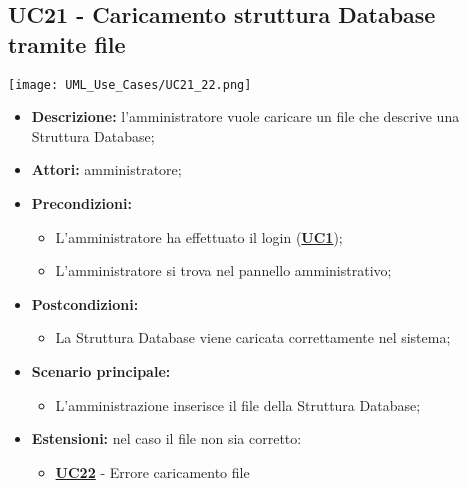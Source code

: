 \subsection{UC21 - Caricamento struttura Database tramite file}
\label{sec:UC21}
\texttt{[image: UML\_Use\_Cases/UC21\_22.png]}
\begin{itemize}
	\item \textbf{Descrizione:} l’amministratore vuole caricare un file che descrive una Struttura Database;
	\item \textbf{Attori:} amministratore;
	\item \textbf{Precondizioni:} 
	\begin{itemize}
		\item L’amministratore ha effettuato il login (\hyperref[sec:UC1]{\textbf{UC1}});
		\item L’amministratore si trova nel pannello amministrativo;
	\end{itemize}
	\item \textbf{Postcondizioni:} 
	\begin{itemize}
		\item La Struttura Database viene caricata correttamente nel sistema;
	\end{itemize}
	\item \textbf{Scenario principale:} 
	\begin{itemize}
		\item L'amministrazione inserisce il file della Struttura Database;
	\end{itemize}
	\item \textbf{Estensioni:} nel caso il file non sia corretto:
	\begin{itemize}
		\item \hyperref[sec:UC22]{\textbf{UC22}} - Errore caricamento file
	\end{itemize}
\end{itemize}

